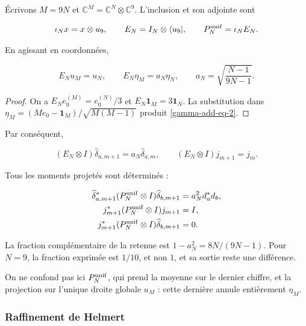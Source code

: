 Écrivons \(M=9N\) et \(\mathbb C^M=\mathbb C^N\otimes\mathbb C^9\). L'inclusion et son adjointe sont

\begin{equation}
\iota_Nx=x\otimes u_9,\qquad
E_N=I_N\otimes\langle u_9|,\qquad P_N^{\rm unif}=\iota_NE_N.
\label{gamma-add-display-8}
\end{equation}

En agissant en coordonnées,

\begin{equation}
E_Nu_M=u_N,\qquad
E_N\eta_M=a_N\eta_N,\qquad
a_N=\sqrt{\frac{N-1}{9N-1}}.
\label{gamma-add-eq-2}
\end{equation}

\begin{proof}
On a \(E_Ne_0^{(M)}=e_0^{(N)}/3\) et \(E_N\mathbf1_M=3\mathbf1_N\).
La substitution dans \(\eta_M=(Me_0-\mathbf1_M)/\sqrt{M(M-1)}\)
produit \eqref{gamma-add-eq-2}.
\end{proof}

Par conséquent,

\begin{equation}
(E_N\otimes I)\widehat\delta_{a,m+1}=a_N\widehat\delta_{a,m},
\qquad
(E_N\otimes I)j_{m+1}=j_m.
\label{gamma-add-eq-3}
\end{equation}

Tous les moments projetés sont déterminés :

\begin{equation}
\begin{aligned}
\widehat\delta_{a,m+1}^*(P_N^{\rm unif}\otimes I)\widehat\delta_{b,m+1}
 &=a_N^2d_a^*d_b,\\
j_{m+1}^*(P_N^{\rm unif}\otimes I)j_{m+1}&=I,\\
j_{m+1}^*(P_N^{\rm unif}\otimes I)\widehat\delta_{b,m+1}&=0.
\end{aligned}
\label{gamma-add-eq-4}
\end{equation}

La fraction complémentaire de la retenue est \(1-a_N^2=8N/(9N-1)\). Pour \(N=9\), la fraction exprimée est \(1/10\), et non \(1\), et sa sortie reste une différence.

On ne confond pas ici \(P_N^{\rm unif}\), qui prend la moyenne sur le dernier chiffre, et la projection sur l'unique droite globale \(u_M\) : cette dernière annule entièrement \(\eta_M\).

\subsubsection{Raffinement de Helmert}
\label{gamma-add-sub-156}

